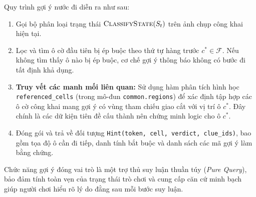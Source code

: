 Quy trình gợi ý nước đi diễn ra như sau:
\begin{enumerate}
    \item Gọi bộ phân loại trạng thái $\textsc{ClassifyState}(S_t)$ trên ảnh chụp công khai hiện tại.
    \item Lọc và tìm ô cờ đầu tiên bị ép buộc theo thứ tự hàng trước $c^* \in \mathcal{F}$. Nếu không tìm thấy ô nào bị ép buộc, cơ chế gợi ý thông báo không có bước đi tất định khả dụng.
    \item \textbf{Truy vết các manh mối liên quan:} Sử dụng hàm phân tích hình học \texttt{referenced\_cells} (trong mô-đun \texttt{common.regions}) để xác định tập hợp các ô cờ công khai mang gợi ý có vùng tham chiếu giao cắt với vị trí ô $c^*$. Đây chính là các dữ kiện tiên đề cấu thành nên chứng minh logic cho ô $c^*$.
    \item Đóng gói và trả về đối tượng \texttt{Hint(token, cell, verdict, clue\_ids)}, bao gồm tọa độ ô cần đi tiếp, danh tính bắt buộc và danh sách các mã gợi ý làm bằng chứng.
\end{enumerate}

Chức năng gợi ý đóng vai trò là một trợ thủ suy luận thuần túy (\textit{Pure Query}), bảo đảm tính toàn vẹn của trạng thái trò chơi và cung cấp căn cứ minh bạch giúp người chơi hiểu rõ lý do đằng sau mỗi bước suy luận.
